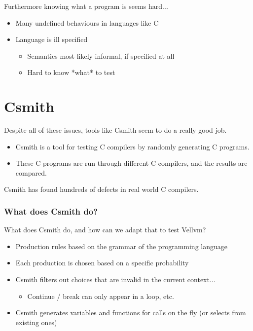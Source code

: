 \documentclass{beamer}
\begin{document}
\begin{frame}
  Furthermore knowing what a program is seems hard...

  \begin{itemize}
  \item Many undefined behaviours in languages like C
  \item Language is ill specified
    \begin{itemize}
    \item Semantics most likely informal, if specified at all
    \item Hard to know *what* to test
    \end{itemize}
  \end{itemize}
\end{frame}

\section{Csmith}

\begin{frame}

  Despite all of these issues, tools like Csmith seem to do a really
  good job.

  \begin{itemize}
  \item Csmith is a tool for testing C compilers by randomly
    generating C programs.
  \item These C programs are run through different C compilers, and
    the results are compared.
  \end{itemize}

  Csmith has found hundreds of defects in real world C compilers.
\end{frame}

\begin{frame}
    \frametitle{What does Csmith do?}
  What does Csmith do, and how can we adapt that to test Vellvm?

  \begin{itemize}
  \item Production rules based on the grammar of the programming
    language
  \item Each production is chosen based on a specific probability
  \item Csmith filters out choices that are invalid in the current
    context...
    \begin{itemize}
    \item Continue / break can only appear in a loop, etc.
    \end{itemize}
  \item Csmith generates variables and functions for calls on the fly
    (or selects from existing ones)
  \end{itemize}
\end{frame}
\end{document}
